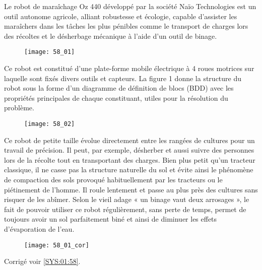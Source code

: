 \normaltrue \difficilefalse \tdifficilefalse
\correctiontrue

\setcounter{question}{0}

\ifcorrection
\else
{}
\fi

\ifprof
\else

Le robot de maraîchage Oz 440 développé par la société Naïo Technologies est un outil autonome
agricole, alliant robustesse et écologie, capable d’assister les maraîchers dans les tâches les plus
pénibles comme le transport de charges lors des récoltes et le désherbage mécanique à l’aide d’un
outil de binage.


\begin{figure}[H]
\centering
\texttt{[image: 58\_01]}
\end{figure}


Ce robot est constitué d’une plate-forme mobile électrique à 4 roues motrices sur laquelle sont
fixés divers outils et capteurs. La figure 1 donne la structure du robot sous la forme d’un
diagramme de définition de blocs (BDD) avec les propriétés principales de chaque constituant,
utiles pour la résolution du problème.

\begin{figure}[H]
\centering
\texttt{[image: 58\_02]}
\end{figure}


Ce robot de petite taille évolue directement entre les rangées de cultures pour un travail de
précision. Il peut, par exemple, désherber et aussi suivre des personnes lors de la récolte tout en
transportant des charges. Bien plus petit qu’un tracteur classique, il ne casse pas la structure
naturelle du sol et évite ainsi le phénomène de compaction des sols provoqué habituellement par les
tracteurs ou le piétinement de l’homme. Il roule lentement et passe au plus près des cultures sans
risquer de les abîmer. Selon le vieil adage « un binage vaut deux arrosages », le fait de pouvoir
utiliser ce robot régulièrement, sans perte de temps, permet de toujours avoir un sol parfaitement
biné et ainsi de diminuer les effets d’évaporation de l’eau.
\fi

\ifprof

\begin{figure}[H]
\centering
\texttt{[image: 58\_01\_cor]}
\end{figure}

\else
\begin{flushright}
\footnotesize{Corrigé  voir \ref{SYS:01:58}.}
\end{flushright}%
\fi